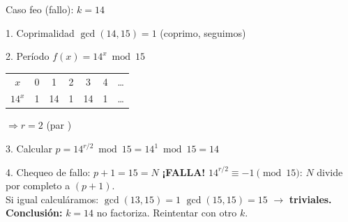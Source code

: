\documentclass[aspectratio=169]{beamer}
\begin{document}
\begin{frame}{Caso feo (fallo): $k=14$}
  \begin{block}{1. Coprimalidad}
    $\gcd(14,15)=1$ \checkmark \quad(coprimo, seguimos)
  \end{block}

  \begin{block}{2. Período $f(x)=14^x\bmod 15$}
    \begin{tabular}{c|cccccc}
      $x$       & 0 & 1  & 2 & 3  & 4 & \ldots \\
      $14^x$    & 1 & 14 & 1 & 14 & 1 & \ldots
    \end{tabular}
    \quad$\Rightarrow r=2$ (par \checkmark)
  \end{block}

  \begin{block}{3. Calcular $p=14^{r/2}\bmod 15 = 14^1\bmod 15 = 14$}
  \end{block}

  \begin{alertblock}{4. Chequeo de fallo: $p+1=15=N$ \; \textbf{¡FALLA!}}
    $14^{r/2}\equiv -1\pmod{15}$: $N$ divide por completo a $(p+1)$.\\[2pt]
    Si igual calculáramos:
    \;$\gcd(13,15)=1$ \quad $\gcd(15,15)=15$ \quad $\to$ \textbf{triviales.}\\[2pt]
    \textbf{Conclusión:} $k=14$ no factoriza. Reintentar con otro $k$.
  \end{alertblock}

\end{frame}
\end{document}
